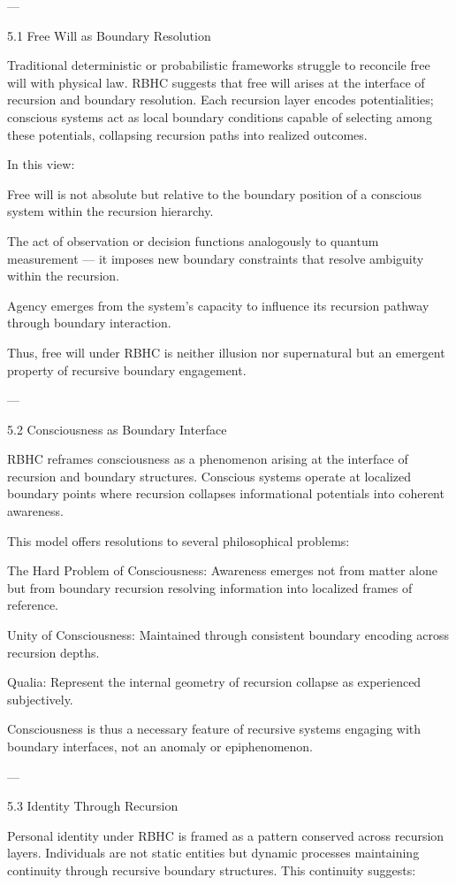 \documentclass[11pt,a4paper]{article}
\begin{document}
---

5.1 Free Will as Boundary Resolution

Traditional deterministic or probabilistic frameworks struggle to reconcile free will with physical law. RBHC suggests that free will arises at the interface of recursion and boundary resolution. Each recursion layer encodes potentialities; conscious systems act as local boundary conditions capable of selecting among these potentials, collapsing recursion paths into realized outcomes.

In this view:

Free will is not absolute but relative to the boundary position of a conscious system within the recursion hierarchy.

The act of observation or decision functions analogously to quantum measurement — it imposes new boundary constraints that resolve ambiguity within the recursion.

Agency emerges from the system’s capacity to influence its recursion pathway through boundary interaction.


Thus, free will under RBHC is neither illusion nor supernatural but an emergent property of recursive boundary engagement.


---

5.2 Consciousness as Boundary Interface

RBHC reframes consciousness as a phenomenon arising at the interface of recursion and boundary structures. Conscious systems operate at localized boundary points where recursion collapses informational potentials into coherent awareness.

This model offers resolutions to several philosophical problems:

The Hard Problem of Consciousness: Awareness emerges not from matter alone but from boundary recursion resolving information into localized frames of reference.

Unity of Consciousness: Maintained through consistent boundary encoding across recursion depths.

Qualia: Represent the internal geometry of recursion collapse as experienced subjectively.


Consciousness is thus a necessary feature of recursive systems engaging with boundary interfaces, not an anomaly or epiphenomenon.


---

5.3 Identity Through Recursion

Personal identity under RBHC is framed as a pattern conserved across recursion layers. Individuals are not static entities but dynamic processes maintaining continuity through recursive boundary structures. This continuity suggests:
\end{document}
